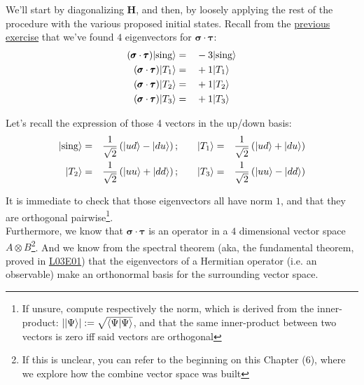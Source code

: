 \documentclass[solutions.tex]{subfiles}
\begin{document}
\hr

We'll start by diagonalizing $\bm{H}$, and then, by loosely applying the rest
of the procedure with the various proposed initial states. Recall from the
\href{https://github.com/mbivert/ttm/blob/master/qm/L06E09.pdf}{previous exercise}
that we've found $4$ eigenvectors for $\bm{\sigma}\cdot\bm{\tau}$:
\begin{equation*}\begin{aligned}
	(\pmb{\sigma}\cdot\pmb{\tau})|\text{sing}\rangle &=&& -3|\text{sing}\rangle \\
	(\pmb{\sigma}\cdot\pmb{\tau})|T_1\rangle &=&& +1|T_1\rangle \\
	(\pmb{\sigma}\cdot\pmb{\tau})|T_2\rangle &=&& +1|T_2\rangle \\
	(\pmb{\sigma}\cdot\pmb{\tau})|T_3\rangle &=&& +1|T_3\rangle \\
\end{aligned}\end{equation*}

Let's recall the expression of those 4 vectors in the up/down basis:
\begin{equation*}\begin{aligned}
	|\text{sing}\rangle &=&& \frac1{\sqrt2}\left(|ud\rangle-|du\rangle\right); &&&
	|T_1\rangle &=&& \frac1{\sqrt2}\left(|ud\rangle+|du\rangle\right) \\
	|T_2\rangle &=&& \frac1{\sqrt2}\left(|uu\rangle+|dd\rangle\right); &&&
	|T_3\rangle &=&& \frac1{\sqrt2}\left(|uu\rangle-|dd\rangle\right)
\end{aligned}\end{equation*}

It is immediate to check that those eigenvectors all have norm $1$, and that
they are orthogonal pairwise\footnote{If unsure, compute respectively the
norm, which is derived from the inner-product:
$||\Psi\rangle| := \sqrt{\left\langle \Psi \middle| \Psi \right\rangle}$, and that the same inner-product
between two vectors is zero iff said vectors are orthogonal}. \\

Furthermore, we know that $\bm{\sigma}\cdot\bm{\tau}$ is an operator in
a $4$ dimensional vector space $A\otimes B$\footnote{If this is unclear, you
can refer to the beginning on this Chapter ($6$), where we explore how
the combine vector space was built}. And we know from the spectral theorem
(aka, the fundamental theorem, proved in
\href{https://github.com/mbivert/ttm/blob/master/qm/L03E01.pdf}{L03E01})
that the eigenvectors of a Hermitian operator (i.e. an observable) make
an orthonormal basis for the surrounding vector space. \\
\end{document}
